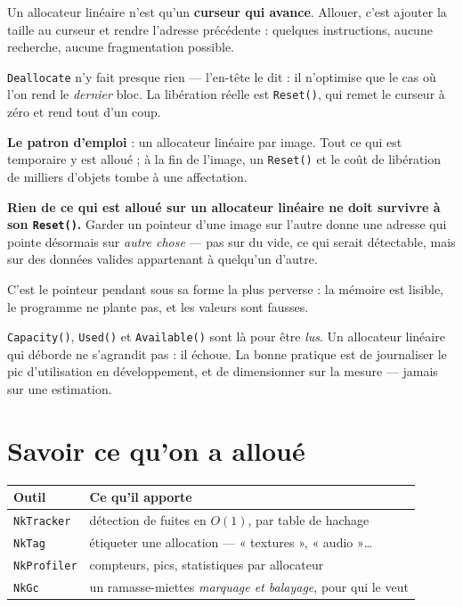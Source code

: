 \begin{nkretenir}
Un allocateur linéaire n'est qu'un \textbf{curseur qui avance}. Allouer, c'est
ajouter la taille au curseur et rendre l'adresse précédente : quelques
instructions, aucune recherche, aucune fragmentation possible.

\texttt{Deallocate} n'y fait presque rien --- l'en-tête le dit : il n'optimise
que le cas où l'on rend le \emph{dernier} bloc. La libération réelle est
\texttt{Reset()}, qui remet le curseur à zéro et rend tout d'un coup.

\textbf{Le patron d'emploi} : un allocateur linéaire par image. Tout ce qui est
temporaire y est alloué ; à la fin de l'image, un \texttt{Reset()} et le coût de
libération de milliers d'objets tombe à une affectation.
\end{nkretenir}

\begin{nkpiege}
\textbf{Rien de ce qui est alloué sur un allocateur linéaire ne doit survivre à
son \texttt{Reset()}.} Garder un pointeur d'une image sur l'autre donne une
adresse qui pointe désormais sur \emph{autre chose} --- pas sur du vide, ce qui
serait détectable, mais sur des données valides appartenant à quelqu'un d'autre.

C'est le pointeur pendant sous sa forme la plus perverse : la mémoire est
lisible, le programme ne plante pas, et les valeurs sont fausses.
\end{nkpiege}

\begin{nkretenir}
\texttt{Capacity()}, \texttt{Used()} et \texttt{Available()} sont là pour être
\emph{lus}. Un allocateur linéaire qui déborde ne s'agrandit pas : il échoue. La
bonne pratique est de journaliser le pic d'utilisation en développement, et de
dimensionner sur la mesure --- jamais sur une estimation.
\end{nkretenir}

\section{Savoir ce qu'on a alloué}

\begin{center}
\begin{tabular}{@{}ll@{}}
\toprule
\textbf{Outil} & \textbf{Ce qu'il apporte} \\
\midrule
\texttt{NkTracker} & détection de fuites en $O(1)$, par table de hachage \\
\texttt{NkTag} & étiqueter une allocation --- « textures », « audio »\dots \\
\texttt{NkProfiler} & compteurs, pics, statistiques par allocateur \\
\texttt{NkGc} & un ramasse-miettes \emph{marquage et balayage}, pour qui le veut \\
\bottomrule
\end{tabular}
\end{center}

